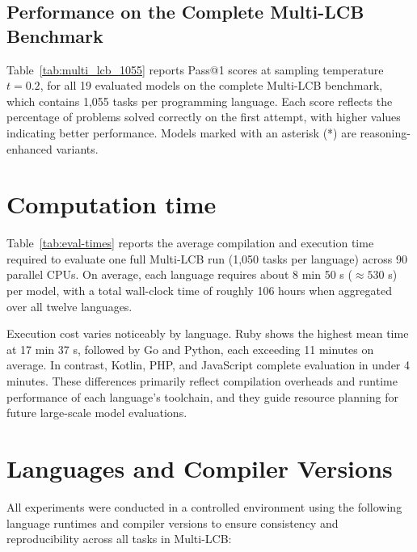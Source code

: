 \documentclass{article} %
\begin{document}



\subsection{Performance on the Complete Multi-LCB Benchmark}




Table~\ref{tab:multi_lcb_1055} reports Pass@1 scores at sampling temperature $t = 0.2$, for all 19 evaluated models on the complete Multi-LCB benchmark, which contains 1,055 tasks per programming language. Each score reflects the percentage of problems solved correctly on the first attempt, with higher values indicating better performance. Models marked with an asterisk (*) are reasoning-enhanced variants.






\section{Computation time}

Table~\ref{tab:eval-times} reports the average compilation and execution time required to evaluate one full Multi-LCB run (1,050 tasks per language) across 90 parallel CPUs. On average, each language requires about 8 min 50 s ($\approx 530$ s) per model, with a total wall-clock time of roughly 106 hours when aggregated over all twelve languages.

Execution cost varies noticeably by language. Ruby shows the highest mean time at 17 min 37 s, followed by Go and Python, each exceeding 11 minutes on average. In contrast, Kotlin, PHP, and JavaScript complete evaluation in under 4 minutes. These differences primarily reflect compilation overheads and runtime performance of each language’s toolchain, and they guide resource planning for future large-scale model evaluations.





\section{Languages and Compiler Versions}
All experiments were conducted in a controlled environment using the following language runtimes and compiler versions to ensure consistency and reproducibility across all tasks in Multi-LCB:
\end{document}

